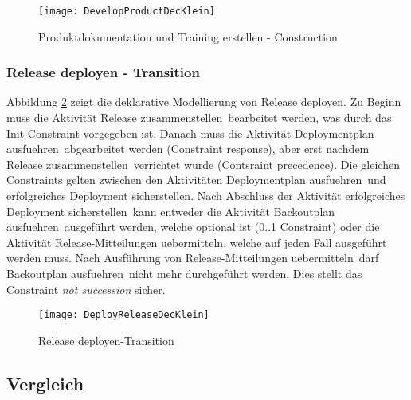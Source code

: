 \begin{figure}[htp]
\begin{center}
  \texttt{[image: DevelopProductDecKlein]} %
  \caption{Produktdokumentation und Training erstellen - Construction}
  \label{fig:DevelopProductDecKlein}
\end{center}
\end{figure}

 \subsubsection{Release deployen - Transition}

Abbildung \ref{fig:DeployReleaseDecKlein} zeigt die deklarative Modellierung von \grqq Release deployen\grqq.\newline
Zu Beginn muss die Aktivität \grqq Release zusammenstellen\grqq \ bearbeitet werden, was durch das Init-Constraint vorgegeben ist. Danach muss die Aktivität \grqq Deploymentplan ausfuehren\grqq \ abgearbeitet werden (Constraint response), aber erst nachdem \grqq Release zusammenstellen\grqq \ verrichtet wurde (Contsraint precedence).\newline
Die gleichen Constraints gelten zwischen den Aktivitäten \grqq Deploymentplan ausfuehren\grqq \ und \grqq erfolgreiches Deployment sicherstellen\grqq.\newline
Nach Abschluss der Aktivität \grqq erfolgreiches Deployment sicherstellen\grqq \ kann entweder die Aktivität \grqq Backoutplan ausfuehren\grqq \ ausgeführt werden, welche optional ist (0..1 Constraint) oder die Aktivität \grqq Release-Mitteilungen uebermitteln\grqq, welche auf jeden Fall ausgeführt werden muss.\newline 
Nach Ausführung von \grqq Release-Mitteilungen uebermitteln\grqq \ darf \grqq Backoutplan ausfuehren\grqq \ nicht mehr durchgeführt werden. Dies stellt das Constraint \textit{not succession} sicher.
\begin{figure}[htp]
\begin{center}
  \texttt{[image: DeployReleaseDecKlein]} %
  \caption{Release deployen-Transition}
  \label{fig:DeployReleaseDecKlein}
\end{center}
\end{figure}

\clearpage

\subsection{Vergleich}

